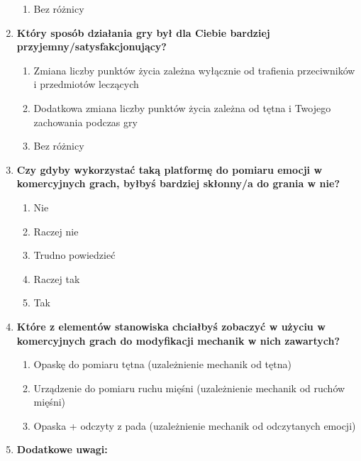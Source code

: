 \begin{enumerate}
\begin{enumerate}[label=(\alph*)]
		\item Bez różnicy
	\end{enumerate}
	\item \textbf{Który sposób działania gry był dla Ciebie bardziej przyjemny/satysfakcjonujący?}
	\begin{enumerate}[label=(\alph*)]
		\item Zmiana liczby punktów życia zależna wyłącznie od trafienia przeciwników i przedmiotów leczących
		\item Dodatkowa zmiana liczby punktów życia zależna od tętna i Twojego zachowania podczas gry
		\item Bez różnicy
	\end{enumerate}
	\item \textbf{Czy gdyby wykorzystać taką platformę do pomiaru emocji w komercyjnych grach, byłbyś bardziej skłonny/a do grania w nie?}
	\begin{enumerate}[label=(\alph*)]
		\item Nie
		\item Raczej nie
		\item Trudno powiedzieć
		\item Raczej tak
		\item Tak
	\end{enumerate}
	\item \textbf{Które z elementów stanowiska chciałbyś zobaczyć w użyciu w komercyjnych grach do modyfikacji mechanik w nich zawartych?}
	\begin{enumerate}[label=(\alph*)]
		\item Opaskę do pomiaru tętna (uzależnienie mechanik od tętna)
		\item Urządzenie do pomiaru ruchu mięśni (uzależnienie mechanik od ruchów mięśni)
		\item Opaska + odczyty z pada (uzależnienie mechanik od odczytanych emocji)
	\end{enumerate}
	\item \textbf{Dodatkowe uwagi:}
\end{enumerate}
